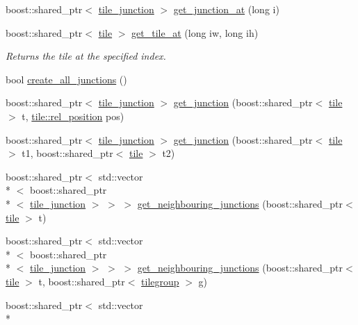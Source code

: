 \begin{DoxyCompactItemize}
\item 
boost\-::shared\-\_\-ptr$<$ \hyperlink{classtile__junction}{tile\-\_\-junction} $>$ \hyperlink{classtiled__image_a0b7dbc0229e16ce6f22df4c4c47afc6e}{get\-\_\-junction\-\_\-at} (long i)
\item 
boost\-::shared\-\_\-ptr$<$ \hyperlink{classtile}{tile} $>$ \hyperlink{classtiled__image_a0b800608334dc6e097f5d7828e0011b6}{get\-\_\-tile\-\_\-at} (long iw, long ih)
\begin{DoxyCompactList}\small\item\em Returns the tile at the specified index. \end{DoxyCompactList}\item 
bool \hyperlink{classtiled__image_a514919bd673c1dbd93d508f1d3f94ccd}{create\-\_\-all\-\_\-junctions} ()
\item 
boost\-::shared\-\_\-ptr$<$ \hyperlink{classtile__junction}{tile\-\_\-junction} $>$ \hyperlink{classtiled__image_a166df72f9850b94c772a0f61fa362aae}{get\-\_\-junction} (boost\-::shared\-\_\-ptr$<$ \hyperlink{classtile}{tile} $>$ t, \hyperlink{classtile_a637de74fd50d4b3583b657caa4bf0301}{tile\-::rel\-\_\-position} pos)
\item 
boost\-::shared\-\_\-ptr$<$ \hyperlink{classtile__junction}{tile\-\_\-junction} $>$ \hyperlink{classtiled__image_a6c1a917c13f994b3bfdb23b8215b8658}{get\-\_\-junction} (boost\-::shared\-\_\-ptr$<$ \hyperlink{classtile}{tile} $>$ t1, boost\-::shared\-\_\-ptr$<$ \hyperlink{classtile}{tile} $>$ t2)
\item 
boost\-::shared\-\_\-ptr$<$ std\-::vector\\*
$<$ boost\-::shared\-\_\-ptr\\*
$<$ \hyperlink{classtile__junction}{tile\-\_\-junction} $>$ $>$ $>$ \hyperlink{classtiled__image_aea1e2cca50d9c3b5a6d012daf33e871a}{get\-\_\-neighbouring\-\_\-junctions} (boost\-::shared\-\_\-ptr$<$ \hyperlink{classtile}{tile} $>$ t)
\item 
boost\-::shared\-\_\-ptr$<$ std\-::vector\\*
$<$ boost\-::shared\-\_\-ptr\\*
$<$ \hyperlink{classtile__junction}{tile\-\_\-junction} $>$ $>$ $>$ \hyperlink{classtiled__image_aca93dc758da7972d63f9b6ae3b845be7}{get\-\_\-neighbouring\-\_\-junctions} (boost\-::shared\-\_\-ptr$<$ \hyperlink{classtile}{tile} $>$ t, boost\-::shared\-\_\-ptr$<$ \hyperlink{classtilegroup}{tilegroup} $>$ g)
\item 
boost\-::shared\-\_\-ptr$<$ std\-::vector\\*

\end{DoxyCompactItemize}

